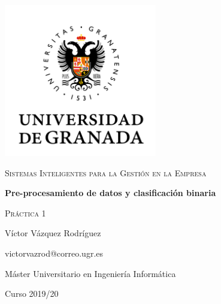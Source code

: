 \documentclass{article}
\begin{document}
\begin{titlepage}
    \centering
    \includegraphics[width=0.5\textwidth]{images/logo-ugr.png}\par
    \vspace{1cm}
    {\Large\scshape Sistemas Inteligentes para la Gestión en la Empresa \par}
    {\huge\bfseries Pre-procesamiento de datos y clasificación binaria \par}
    \vspace{0.2cm}
    {\scshape Práctica 1 \par}
    \vfill
    {\large Víctor Vázquez Rodríguez  \par}
    {victorvazrod@correo.ugr.es \par}
    \vfill
    {\large Máster Universitario en Ingeniería Informática \par}
    \vspace{0.2cm}
    {Curso 2019/20 \par}
\end{titlepage}

\tableofcontents\newpage

\newpage
\newpage
\newpage
\newpage
\newpage
\end{document}
